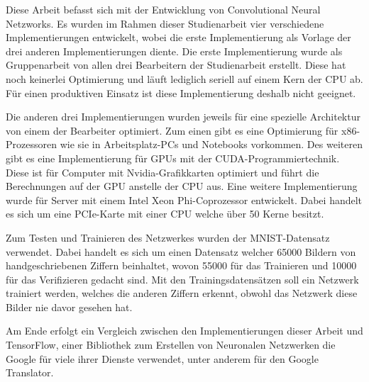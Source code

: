 \documentclass[../main.tex]{subfiles}
\begin{document}
Diese Arbeit befasst sich mit der Entwicklung von Convolutional Neural Netzworks. Es wurden im Rahmen dieser Studienarbeit vier verschiedene Implementierungen entwickelt, wobei die erste Implementierung als Vorlage der drei anderen Implementierungen diente. Die erste Implementierung wurde als Gruppenarbeit von allen drei Bearbeitern der Studienarbeit erstellt. Diese hat noch keinerlei Optimierung und läuft lediglich seriell auf einem Kern der CPU ab. Für einen produktiven Einsatz ist diese Implementierung deshalb nicht geeignet.

Die anderen drei Implementierungen wurden jeweils für eine spezielle Architektur von einem der Bearbeiter optimiert. Zum einen gibt es eine Optimierung für x86-Prozessoren wie sie in Arbeitsplatz-PCs und Notebooks vorkommen. Des weiteren gibt es eine Implementierung für GPUs mit der CUDA-Programmiertechnik. Diese ist für Computer mit Nvidia-Grafikkarten optimiert und führt die Berechnungen auf der GPU anstelle der CPU aus. Eine weitere Implementierung wurde für Server mit einem Intel Xeon Phi-Coprozessor entwickelt. Dabei handelt es sich um eine PCIe-Karte mit einer CPU welche über 50 Kerne besitzt.

Zum Testen und Trainieren des Netzwerkes wurden der MNIST-Datensatz verwendet. Dabei handelt es sich um einen Datensatz welcher 65000 Bildern von handgeschriebenen Ziffern beinhaltet, wovon 55000 für das Trainieren und 10000 für das Verifizieren gedacht sind. Mit den Trainingsdatensätzen soll ein Netzwerk trainiert werden, welches die anderen Ziffern erkennt, obwohl das Netzwerk diese Bilder nie davor gesehen hat.

Am Ende erfolgt ein Vergleich zwischen den Implementierungen dieser Arbeit und TensorFlow, einer Bibliothek zum Erstellen von Neuronalen Netzwerken die Google für viele ihrer Dienste verwendet, unter anderem für den Google Translator.
\end{document}
